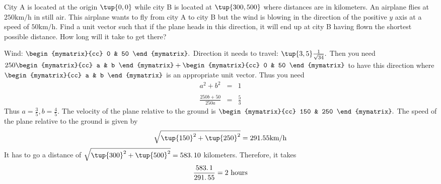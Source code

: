 \begin{enumialphparenastyle}
\begin{ex} 
City A is located at the origin $\tup{0,0 }$ while city B is located at $\tup{300,500 } $ where distances are in kilometers. An airplane flies at $250\textrm{km}/\textrm{h}$ in still air. This airplane wants to fly from city A to city
B but the wind is blowing in the direction of the positive $y$ axis at a
speed of $50\textrm{km}/\textrm{h}$. Find a unit vector such that if the plane heads
in this direction, it will end up at city B having flown the shortest
possible distance. How long will it take to get there? \vspace{1mm}
\begin{sol}
Wind: $\begin{mymatrix}{cc}
0 & 50
\end{mymatrix} .$ Direction it needs to travel: $\tup{3,5 } \frac{1}{\sqrt{34}}.$ Then you need $250 \begin{mymatrix}{cc}
 a & b
\end{mymatrix} + \begin{mymatrix}{cc}
0 & 50
\end{mymatrix} $ to
have this direction where $\begin{mymatrix}{cc}
 a & b
\end{mymatrix} $ is an appropriate unit
vector. Thus you need
\begin{eqnarray*}
a^{2}+b^{2} &=&1 \\ 
& & \\
\frac{250b+50}{250a} &=&\frac{5}{3}
\end{eqnarray*}
Thus $a=\frac{3}{5},b=\frac{4}{5}.$ The velocity of the plane relative
to the ground is $\begin{mymatrix}{cc}
150 & 250
\end{mymatrix} .$ The speed of the plane relative to the ground is given by 
\[
\sqrt{\tup{150} ^{2}+\tup{250} ^{2}}=
291.55 \textrm{km}/\textrm{h}
\]
It has to go a distance of $\sqrt{\tup{300} ^{2}+\tup{500}
^{2}}=\allowbreak 583.\,\allowbreak 10$ kilometers. Therefore, it takes
\[
\frac{\allowbreak 583.\,\allowbreak 1}{\allowbreak 291.\,\allowbreak 55}=2
\text{ hours}
\]
\end{sol}
\end{ex}


\end{enumialphparenastyle}
